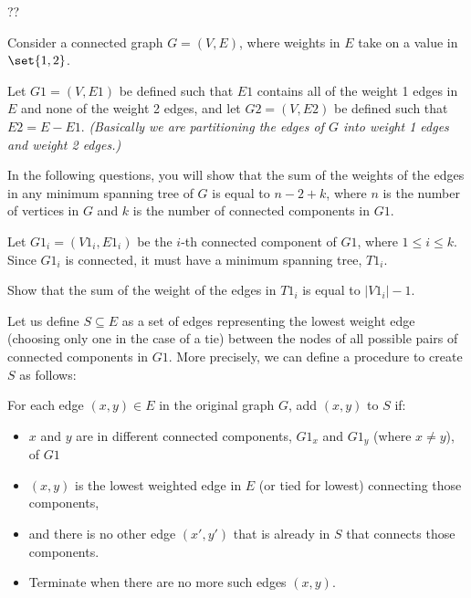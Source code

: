 \documentclass[12pt,oneside]{article}
\begin{document}
\begin{problem}{??}

Consider a connected graph $G = (V,E)$, where weights in $E$ take on a value in $\set{1,2}$.

Let $G1 = (V, E1)$ be defined such that $E1$ contains all of the weight 1 edges in $E$ and none of the weight 2 edges, and let $G2 = (V,E2)$ be defined such that $E2 = E - E1$. \textit{(Basically we are partitioning the edges of $G$ into weight 1 edges and weight 2 edges.)}

In the following questions, you will show that the sum of the weights of the edges in any minimum spanning tree of $G$ is equal to $n-2+k$, where $n$ is the number of vertices in $G$ and $k$ is the number of connected components in $G1$.

\vspace{0.25in}

Let $G1_i = (V1_i, E1_i)$ be the $i$-th connected component of $G1$, where $1 \leq i \leq k$. Since $G1_i$ is connected, it must have a minimum spanning tree, $T1_i$.

\bparts
\ppart {} Show that the sum of the weight of the edges in $T1_i$ is equal to $|V1_i| - 1$.
\eparts

\vspace{0.25in}

Let us define $S \subseteq E$ as a set of edges representing the lowest weight edge (choosing only one in the case of a tie) between the nodes of all possible pairs of connected components in $G1$. More precisely, we can define a procedure to create $S$ as follows:

For each edge $(x,y) \in E$ in the original graph $G$, add $(x,y)$ to $S$ if:
\begin{itemize}
\item $x$ and $y$ are in different connected components, $G1_x$ and $G1_y$ (where $x \neq y$), of $G1$
\item $(x,y)$ is the lowest weighted edge in $E$ (or tied for lowest) connecting those components,
\item and there is no other edge $(x',y')$ that is already in $S$ that connects those components.
\item Terminate when there are no more such edges $(x,y)$.
\end{itemize}


\end{problem}
\end{document}
